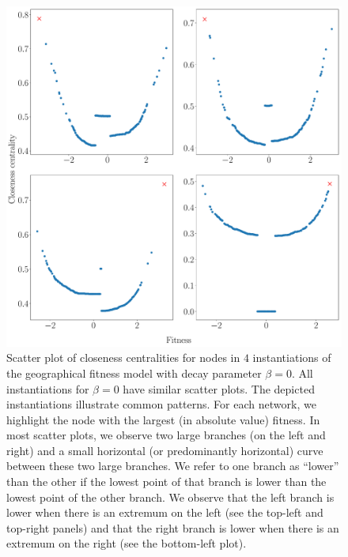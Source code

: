 \documentclass[%
 reprint,
 amsmath,amssymb,
 aps,
]{revtex4-1}
\begin{document}
\begin{figure}
    \centering
    \includegraphics[width=0.8\linewidth]{geographic_beta_0_examples2_largerfont.pdf}
    \caption{Scatter plot of closeness centralities for nodes in $4$ instantiations of the geographical fitness model with decay parameter $\beta = 0$. All instantiations for $\beta = 0$ have similar scatter plots. The depicted instantiations illustrate common patterns. For each network, we highlight the node with the largest (in absolute value) fitness. In most scatter plots, we observe two large branches (on the left and right) and a small horizontal (or predominantly horizontal) curve between these two large branches. We refer to one branch as ``lower'' than the other if the lowest point of that branch is lower than the lowest point of the other branch. We observe that the left branch is lower when there is an extremum on the left (see the top-left and top-right panels) and that the right branch is lower when there is an extremum on the right (see the bottom-left plot). 
    }
    \label{fig:closeness_example}
\end{figure}


 
\end{document}
